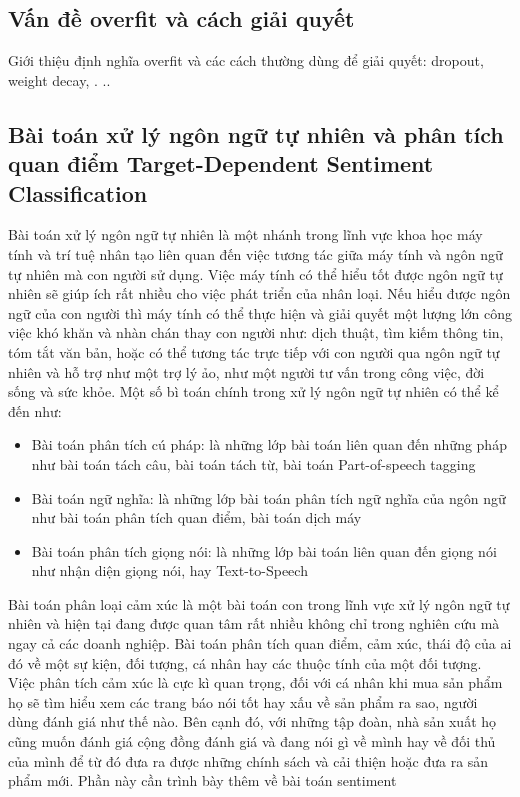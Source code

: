 \documentclass[fontsize=12pt]{scrartcl}
\begin{document}
\subsection{Vấn đề overfit và cách giải quyết}
Giới thiệu định nghĩa overfit và các cách thường dùng để giải quyết: dropout, weight decay, . .. 
\subsection{Bài toán xử lý ngôn ngữ tự nhiên và phân tích quan điểm Target-Dependent Sentiment Classification}
\par
Bài toán xử lý ngôn ngữ tự nhiên là một nhánh trong lĩnh vực khoa học máy tính và trí tuệ nhân tạo liên quan đến việc tương tác giữa máy tính và ngôn ngữ tự nhiên mà con người sử dụng. Việc máy tính có thể hiểu tốt được ngôn ngữ tự nhiên sẽ giúp ích rất nhiều cho việc phát triển của nhân loại. Nếu hiểu được ngôn ngữ của con người thì máy tính có thể thực hiện và giải quyết một lượng lớn công việc khó khăn và nhàn chán thay con người như: dịch thuật, tìm kiếm thông tin, tóm tắt văn bản, hoặc có thể tương tác trực tiếp với con người qua ngôn ngữ tự nhiên và hỗ trợ như một trợ lý ảo, như một người tư vấn trong công việc, đời sống và sức khỏe. Một số bì toán chính trong xử lý ngôn ngữ tự nhiên có thể kể đến như:
\begin{itemize}
\item Bài toán phân tích cú pháp: là những lớp bài toán liên quan đến những pháp như bài toán tách câu, bài toán tách từ, bài toán Part-of-speech tagging
\item Bài toán ngữ nghĩa: là những lớp bài toán phân tích ngữ nghĩa của ngôn ngữ như bài toán phân tích quan điểm, bài toán dịch máy
\item Bài toán phân tích giọng nói: là những lớp bài toán liên quan đến giọng nói như nhận diện giọng nói, hay Text-to-Speech
\end{itemize}
\par
Bài toán phân loại cảm xúc là một bài toán con trong lĩnh vực xử lý ngôn ngữ tự nhiên và hiện tại đang được quan tâm rất nhiều không chỉ trong nghiên cứu mà ngay cả các doanh nghiệp. Bài toán phân tích quan điểm, cảm xúc, thái độ của ai đó về một sự kiện, đối tượng, cá nhân hay các thuộc tính của một đối tượng. Việc phân tích cảm xúc là cực kì quan trọng, đối với cá nhân khi mua sản phẩm họ sẽ tìm hiểu xem các trang báo nói tốt hay xấu về sản phẩm ra sao, người dùng đánh giá như thế nào.  Bên cạnh đó, với những tập đoàn, nhà sản xuất họ cũng muốn đánh giá cộng đồng đánh giá và đang nói gì về mình hay về đối thủ của mình để từ đó đưa ra được những chính sách và cải thiện hoặc đưa ra sản phẩm mới.
Phần này cần trình bày thêm về bài toán sentiment
\newpage
\end{document}
